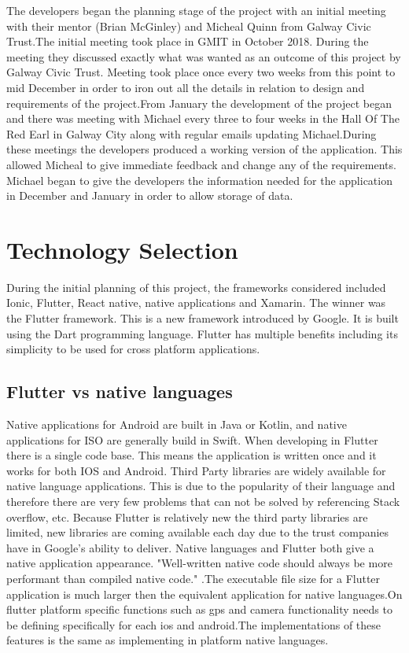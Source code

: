 The developers began the planning stage of the project with an initial meeting with their mentor (Brian McGinley) and Micheal Quinn from Galway Civic Trust.The initial meeting took place in GMIT in October 2018. During the meeting they discussed exactly what was wanted as an outcome of this project by Galway Civic Trust. Meeting took place once every two weeks from this point to mid December in order to iron out all the details in relation to design and requirements of the project.From January the development of the project began and there was meeting with Michael every three to four weeks in the Hall Of The Red Earl in Galway City along with regular emails updating Michael.During these meetings the developers produced a working version of the application. This allowed Micheal to give immediate feedback and change any of the requirements. Michael began to give the developers the information needed for the application in December and January in order to allow storage of data.

\section{Technology Selection}
During the initial planning of this project, the frameworks considered included Ionic, Flutter, React native, native applications and Xamarin. The winner was the Flutter framework. This is a new framework introduced by Google. It is built using the Dart programming language. Flutter has multiple benefits including its simplicity to be used for cross platform applications.


\subsection{Flutter vs native languages}
Native applications for Android are built in Java or Kotlin, and native applications for ISO are generally build in Swift. When developing in Flutter there is a single code base. This means the application is written once and it works for both IOS and Android. Third Party libraries are widely available for native language applications. This is due to the popularity of their language and therefore there are very few problems that can not be solved by referencing Stack overflow, etc. Because Flutter is relatively new the third party libraries are limited, new libraries are coming available each day due to the trust companies have in Google’s ability to deliver. Native languages and Flutter both give a native application appearance. "Well-written native code should always be more performant than compiled native code." \cite{FlutterVS_2018}.The executable file size for a Flutter application is much larger then the equivalent application for native languages.On flutter platform specific functions such as gps and camera functionality needs to be defining specifically for each ios and android.The implementations of these features is the same as implementing in platform native languages.\cite{flutter_application}

